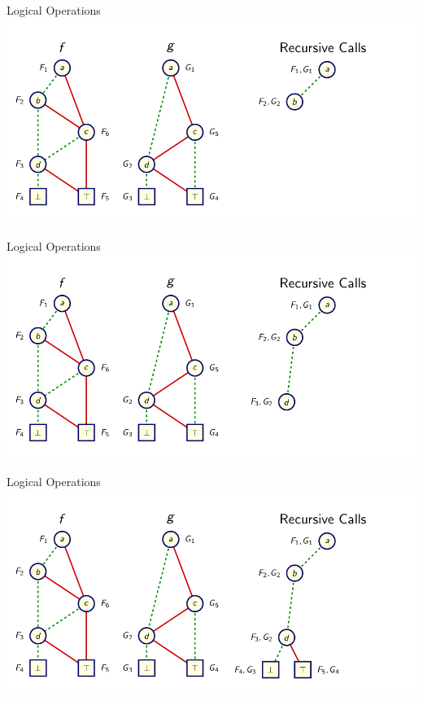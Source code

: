 \documentclass{beamer}
\begin{document}
\begin{frame}{Logical Operations}
\includegraphics[scale=0.35]{ex2.png}
\end{frame}

\begin{frame}{Logical Operations}
\includegraphics[scale=0.35]{ex3.png}
\end{frame}

\begin{frame}{Logical Operations}
\includegraphics[scale=0.35]{ex4.png}
\end{frame}
\end{document}
